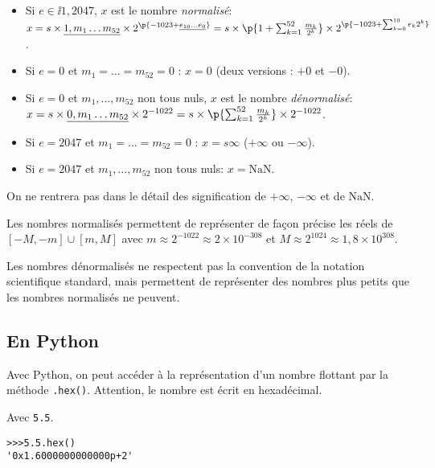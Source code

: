 \begin{itemize}
  \item Si $e\in\ii{1,2047}$, $x$ est le  nombre \emph{normalisé}:
$  x = s \times \underline{1,m_{1}\ldots m_{52}}\times
  2^{\p{-1023+\underline{e_{10}\ldots  e_{0}}}}
  = 
  s \times \p{1+\sum_{k=1}^{52} \frac{m_{k}}{2^{k}}}
  \times 2^{\p{-1023 + \sum_{k=0}^{10} e_{k}2^{k}}}
$.
\item Si $e = 0$ et $m_{1}=\dots=m_{52}=0$ : $x=0$ (deux
  versions : $+0$ et $-0$).

\item  Si $e = 0$ et $m_{1},\ldots,m_{52}$ non tous nuls, $x$ est le nombre
\emph{dénormalisé}:
$
  x = s \times \underline{0,m_{1}\ldots m_{52}}\times
  2^{-1022}
  = 
  s \times \p{\sum_{k=1}^{52} \frac{m_{k}}{2^{k}}}
  \times 2^{-1022}
$.
\item  Si $e= 2047$ et $m_{1}=\ldots= m_{52}=0$ : $x = s\infty$ ($+\infty$
ou $-\infty$).

\item  Si $e = 2047$ et $m_{1},\ldots, m_{52}$ non tous nuls: $x=\text{NaN}$.
\end{itemize}
\begin{rem}
  On ne rentrera pas dans le détail des signification de $+\infty$, $-\infty$ et de $\text{NaN}$.
\end{rem}


Les nombres normalisés permettent de représenter de façon précise les
réels de $[-M,-m]\cup [m, M]$ 
avec $ m \approx2^{-1022}\approx 2\times 10^{-308}$ et 
$M \approx 2^{1024}\approx 1,8 \times 10^{308}$.

Les nombres dénormalisés ne respectent pas la convention de la notation scientifique standard, mais permettent de représenter des nombres plus petits que les nombres normalisés ne peuvent. 



\subsection{En Python}

Avec Python, on peut accéder à la représentation d'un nombre flottant par la méthode \texttt{.hex()}. Attention, le nombre est écrit en hexadécimal. 

\begin{exemple}
  Avec \texttt{5.5}. 
\begin{lstlisting}
>>>5.5.hex()
'0x1.6000000000000p+2'
\end{lstlisting}
\end{exemple}


